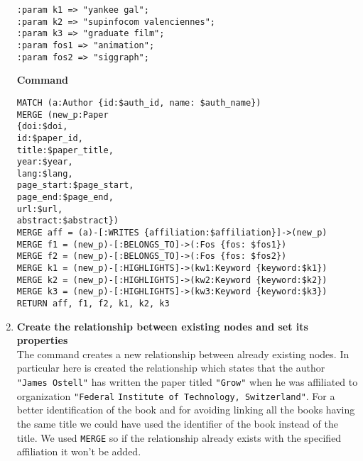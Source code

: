 \begin{enumerate}
\begin{lstlisting}[label={lst:lstlisting8}]
:param k1 => "yankee gal";
:param k2 => "supinfocom valenciennes";
:param k3 => "graduate film";
:param fos1 => "animation";
:param fos2 => "siggraph";
    \end{lstlisting}
    \textbf{Command}
    \begin{lstlisting}[label={lst:lstlisting9}]
MATCH (a:Author {id:$auth_id, name: $auth_name})
MERGE (new_p:Paper
{doi:$doi,
id:$paper_id,
title:$paper_title,
year:$year,
lang:$lang,
page_start:$page_start,
page_end:$page_end,
url:$url,
abstract:$abstract})
MERGE aff = (a)-[:WRITES {affiliation:$affiliation}]->(new_p)
MERGE f1 = (new_p)-[:BELONGS_TO]->(:Fos {fos: $fos1})
MERGE f2 = (new_p)-[:BELONGS_TO]->(:Fos {fos: $fos2})
MERGE k1 = (new_p)-[:HIGHLIGHTS]->(kw1:Keyword {keyword:$k1})
MERGE k2 = (new_p)-[:HIGHLIGHTS]->(kw2:Keyword {keyword:$k2})
MERGE k3 = (new_p)-[:HIGHLIGHTS]->(kw3:Keyword {keyword:$k3})
RETURN aff, f1, f2, k1, k2, k3
    \end{lstlisting}
    \item \textbf{Create the relationship between existing nodes and set its properties}\\
    The command creates a new relationship between already existing nodes.
    In particular here is created the relationship which states that the author \verb|"James Ostell"| has written the paper titled \verb|"Grow"| when he was affiliated to organization \verb|"Federal| \verb|Institute of Technology, Switzerland"|.
    For a better identification of the book and for avoiding linking all the books having the same title we could have used the identifier of the book instead of the title.
    We used \verb|MERGE| so if the relationship already exists with the specified affiliation it won't be added.


\end{enumerate}
